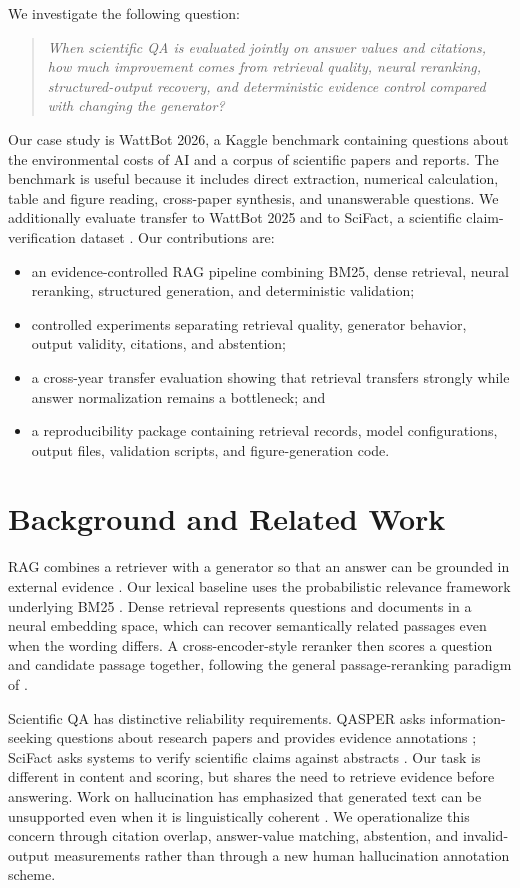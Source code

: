 \documentclass[11pt]{article}
\begin{document}
We investigate the following question:
\begin{quote}
\emph{When scientific QA is evaluated jointly on answer values and citations, how much improvement comes from retrieval quality, neural reranking, structured-output recovery, and deterministic evidence control compared with changing the generator?}
\end{quote}

Our case study is WattBot 2026, a Kaggle benchmark containing questions about the environmental costs of AI and a corpus of scientific papers and reports. The benchmark is useful because it includes direct extraction, numerical calculation, table and figure reading, cross-paper synthesis, and unanswerable questions. We additionally evaluate transfer to WattBot 2025 and to SciFact, a scientific claim-verification dataset \citep{wadden2020scifact}. Our contributions are:
\begin{itemize}
\item an evidence-controlled RAG pipeline combining BM25, dense retrieval, neural reranking, structured generation, and deterministic validation;
\item controlled experiments separating retrieval quality, generator behavior, output validity, citations, and abstention;
\item a cross-year transfer evaluation showing that retrieval transfers strongly while answer normalization remains a bottleneck; and
\item a reproducibility package containing retrieval records, model configurations, output files, validation scripts, and figure-generation code.
\end{itemize}

\section{Background and Related Work}
\label{sec:related}
RAG combines a retriever with a generator so that an answer can be grounded in external evidence \citep{lewis2020rag}. Our lexical baseline uses the probabilistic relevance framework underlying BM25 \citep{robertson2009bm25}. Dense retrieval represents questions and documents in a neural embedding space, which can recover semantically related passages even when the wording differs. A cross-encoder-style reranker then scores a question and candidate passage together, following the general passage-reranking paradigm of \citet{nogueira2019bert}.

Scientific QA has distinctive reliability requirements. QASPER asks information-seeking questions about research papers and provides evidence annotations \citep{dasigi2021qasper}; SciFact asks systems to verify scientific claims against abstracts \citep{wadden2020scifact}. Our task is different in content and scoring, but shares the need to retrieve evidence before answering. Work on hallucination has emphasized that generated text can be unsupported even when it is linguistically coherent \citep{ji2023hallucination}. We operationalize this concern through citation overlap, answer-value matching, abstention, and invalid-output measurements rather than through a new human hallucination annotation scheme.
\end{document}
